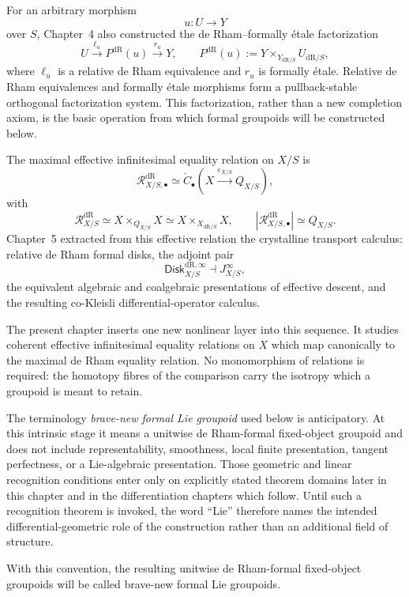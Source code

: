 For an arbitrary morphism
\[
    u:U\longrightarrow Y
\]
over $S$, Chapter~4 also constructed the de Rham--formally \'etale
factorization
\[
    U
    \xrightarrow{\ell_u}
    P^{\mathrm{dR}}(u)
    \xrightarrow{r_u}
    Y,
    \qquad
    P^{\mathrm{dR}}(u)
    :=
    Y\times_{Y_{\mathrm{dR}/S}}U_{\mathrm{dR}/S},
\]
where $\ell_u$ is a relative de Rham equivalence and $r_u$ is formally
\'etale.  Relative de Rham equivalences and formally \'etale morphisms form a
pullback-stable orthogonal factorization system.  This factorization, rather
than a new completion axiom, is the basic operation from which formal
groupoids will be constructed below.

The maximal effective infinitesimal equality relation on $X/S$ is
\[
    \mathcal R^{\mathrm{dR}}_{X/S,\bullet}
    \simeq
    \check C_\bullet
    \left(
        X\xrightarrow{e_{X/S}}Q_{X/S}
    \right),
\]
with
\[
    \mathcal R^{\mathrm{dR}}_{X/S}
    \simeq
    X\times_{Q_{X/S}}X
    \simeq
    X\times_{X_{\mathrm{dR}/S}}X,
    \qquad
    \left|\mathcal R^{\mathrm{dR}}_{X/S,\bullet}\right|
    \simeq Q_{X/S}.
\]
Chapter~5 extracted from this effective relation the crystalline transport
calculus: relative de Rham formal disks, the adjoint pair
\[
    \mathsf{Disk}^{\mathrm{dR},\infty}_{X/S}
    \dashv
    J^\infty_{X/S},
\]
the equivalent algebraic and coalgebraic presentations of effective descent,
and the resulting co-Kleisli differential-operator calculus.

The present chapter inserts one new nonlinear layer into this sequence.  It
studies coherent effective infinitesimal equality relations on $X$ which map
canonically to the maximal de Rham equality relation.  No monomorphism of
relations is required: the homotopy fibres of the comparison carry the
isotropy which a groupoid is meant to retain.

The terminology \emph{brave-new formal Lie groupoid} used below is
anticipatory.  At this intrinsic stage it means a unitwise de Rham-formal
fixed-object groupoid and does not include representability, smoothness,
local finite presentation, tangent perfectness, or a Lie-algebraic
presentation.  Those geometric and linear recognition conditions enter only
on explicitly stated theorem domains later in this chapter and in the
differentiation chapters which follow.  Until such a recognition theorem is
invoked, the word ``Lie'' therefore names the intended differential-geometric
role of the construction rather than an additional field of structure.

With this convention, the resulting unitwise de Rham-formal fixed-object
groupoids will be called brave-new formal Lie groupoids.


